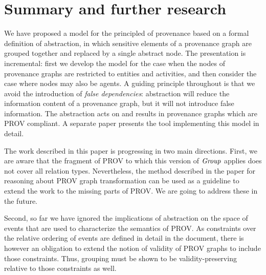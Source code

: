 
\section{Summary and further research}
\label{sec:further}

We have proposed a model for the principled  of provenance based on a formal definition of abstraction, in which sensitive elements of a provenance graph are grouped together and replaced by a single abstract node.  The presentation is incremental: first we develop the model for the case when the nodes of provenance graphs are restricted to entities and activities, and then consider the case where nodes may also be agents.  A guiding principle  throughout is that we avoid the introduction of \emph{false dependencies}: abstraction will reduce the information content of a provenance graph, but it will not introduce false information.  
The abstraction acts on and results in provenance graphs which are PROV compliant.   A separate paper presents the tool implementing this model in detail.


The work described in this paper is progressing in two main directions.
%
First, we are aware that the fragment of PROV to which this version of $\mathit{Group}$ applies does not cover all relation types. Nevertheless, the method described in the paper for reasoning about PROV graph transformation can be used as a guideline to extend the work to the missing parts of PROV. We are going to address these in the future.

Second, so far we have ignored the implications of abstraction on the space of events that are used to characterize the semantics of PROV. As constraints over the relative ordering of events are defined in detail in the  document, there is however an obligation to extend the notion of validity of PROV graphs to include those constraints. Thus, grouping must be shown to be validity-preserving relative to those constraints as well. 


